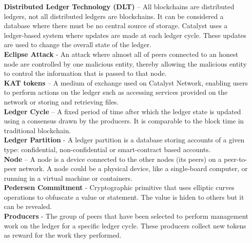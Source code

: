 \textbf{Distributed Ledger Technology (DLT)} – All blockchains are distributed ledgers, not all distributed ledgers are blockchains. It can be considered a database where there must be no central source of storage. Catalyst uses a ledger-based system where updates are made at each ledger cycle. These updates are used to change the overall state of the ledger. \\

\textbf{Eclipse Attack} - An attack where almost all of peers connected to an honest node are controlled by one malicious entity, thereby allowing the malicious entity to control the information that is passed to that node. \\

\textbf{KAT tokens} – A medium of exchange used on Catalyst Network, enabling users to perform actions on the ledger such as accessing services provided on the network or storing and retrieving files. \\

\textbf{Ledger Cycle} – A fixed period of time after which the ledger state is updated using a consensus drawn by the producers. It is comparable to the block time in traditional blockchain. \\

\textbf{Ledger Partition} - A ledger partition is a database storing accounts of a given type: confidential, non-confidential or smart-contract based accounts. \\


\textbf{Node} – A node is a device connected to the other nodes (its peers) on a peer-to-peer network. A node could be a physical device, like a single-board computer, or running in a virtual machine or containers. \\

\textbf{Pedersen Commitment} - Cryptographic primitive that uses elliptic curves operations to obfuscate a value or statement. The value is hiden to others but it can be revealed. \\

\textbf{Producers} - The group of peers that have been selected to perform management work on the ledger for a specific ledger cycle. These producers collect new tokens as reward for the work they performed. \\

